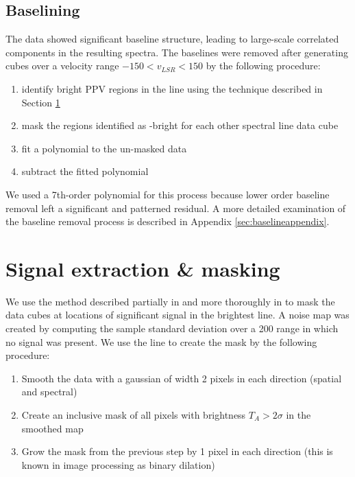 

\subsection{Baselining}
\label{sec:baseline}
The data showed significant baseline structure, leading to large-scale
correlated components in the resulting spectra.  The baselines were removed
after generating cubes over a velocity range $-150 < v_{LSR} < 150$ \kms by the
following procedure:
\begin{enumerate}
    \item identify bright PPV regions in the \para \threeohthree line using the
        technique described in Section \ref{sec:signal}
    \item mask the regions identified as \threeohthree-bright for each other 
        spectral line data cube
    \item fit a polynomial to the un-masked data
    \item subtract the fitted polynomial
\end{enumerate}
We used a 7th-order polynomial for this process because lower order baseline
removal left a significant and patterned residual.  A more detailed examination
of the baseline removal process is described in Appendix
\ref{sec:baselineappendix}.

\section{Signal extraction \& masking}
\label{sec:signal}
We use the method described partially in \citet{Ao2013a} and more thoroughly in
\citet{Dame2011b} to mask the data cubes at locations of significant signal in 
the brightest line. 
A noise map was created by computing the sample standard deviation over a
200 \kms range in which no signal was present.
We use the \para \threeohthree line to create the mask by
the following procedure:

\begin{enumerate}
    \item Smooth the data with a gaussian of width 2 pixels in each direction
        (spatial and spectral)
    \item Create an inclusive mask of all pixels with brightness $T_A >
        2\sigma$ in the smoothed map
    \item Grow the mask from the previous step by 1 pixel in each direction
        (this is known in image processing as binary dilation)
\end{enumerate}

